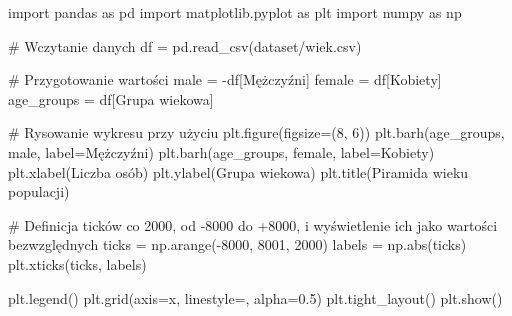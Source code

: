 \documentclass[
  polish,
  letterpaper,
  DIV=11,
  numbers=noendperiod]{scrreprt}
\newenvironment{Shaded}{\begin{snugshade}}{\end{snugshade}}
\newcommand{\BuiltInTok}[1]{\textcolor[rgb]{0.00,0.23,0.31}{#1}}
\newcommand{\CommentTok}[1]{\textcolor[rgb]{0.37,0.37,0.37}{#1}}
\newcommand{\DecValTok}[1]{\textcolor[rgb]{0.68,0.00,0.00}{#1}}
\newcommand{\FloatTok}[1]{\textcolor[rgb]{0.68,0.00,0.00}{#1}}
\newcommand{\ImportTok}[1]{\textcolor[rgb]{0.00,0.46,0.62}{#1}}
\newcommand{\NormalTok}[1]{\textcolor[rgb]{0.00,0.23,0.31}{#1}}
\newcommand{\OperatorTok}[1]{\textcolor[rgb]{0.37,0.37,0.37}{#1}}
\newcommand{\StringTok}[1]{\textcolor[rgb]{0.13,0.47,0.30}{#1}}
\begin{document}
\begin{Shaded}
\begin{Highlighting}[]
\ImportTok{import}\NormalTok{ pandas }\ImportTok{as}\NormalTok{ pd}
\ImportTok{import}\NormalTok{ matplotlib.pyplot }\ImportTok{as}\NormalTok{ plt}
\ImportTok{import}\NormalTok{ numpy }\ImportTok{as}\NormalTok{ np}

\CommentTok{\# Wczytanie danych}
\NormalTok{df }\OperatorTok{=}\NormalTok{ pd.read\_csv(}\StringTok{\textquotesingle{}dataset/wiek.csv\textquotesingle{}}\NormalTok{)}

\CommentTok{\# Przygotowanie wartości}
\NormalTok{male }\OperatorTok{=} \OperatorTok{{-}}\NormalTok{df[}\StringTok{\textquotesingle{}Mężczyźni\textquotesingle{}}\NormalTok{]}
\NormalTok{female }\OperatorTok{=}\NormalTok{ df[}\StringTok{\textquotesingle{}Kobiety\textquotesingle{}}\NormalTok{]}
\NormalTok{age\_groups }\OperatorTok{=}\NormalTok{ df[}\StringTok{\textquotesingle{}Grupa wiekowa\textquotesingle{}}\NormalTok{]}

\CommentTok{\# Rysowanie wykresu przy użyciu}
\NormalTok{plt.figure(figsize}\OperatorTok{=}\NormalTok{(}\DecValTok{8}\NormalTok{, }\DecValTok{6}\NormalTok{))}
\NormalTok{plt.barh(age\_groups, male, label}\OperatorTok{=}\StringTok{\textquotesingle{}Mężczyźni\textquotesingle{}}\NormalTok{)}
\NormalTok{plt.barh(age\_groups, female, label}\OperatorTok{=}\StringTok{\textquotesingle{}Kobiety\textquotesingle{}}\NormalTok{)}
\NormalTok{plt.xlabel(}\StringTok{\textquotesingle{}Liczba osób\textquotesingle{}}\NormalTok{)}
\NormalTok{plt.ylabel(}\StringTok{\textquotesingle{}Grupa wiekowa\textquotesingle{}}\NormalTok{)}
\NormalTok{plt.title(}\StringTok{\textquotesingle{}Piramida wieku populacji\textquotesingle{}}\NormalTok{)}

\CommentTok{\# Definicja ticków co 2000, od {-}8000 do +8000, i wyświetlenie ich jako wartości bezwzględnych}
\NormalTok{ticks }\OperatorTok{=}\NormalTok{ np.arange(}\OperatorTok{{-}}\DecValTok{8000}\NormalTok{, }\DecValTok{8001}\NormalTok{, }\DecValTok{2000}\NormalTok{)}
\NormalTok{labels }\OperatorTok{=}\NormalTok{ np.}\BuiltInTok{abs}\NormalTok{(ticks)}
\NormalTok{plt.xticks(ticks, labels)}

\NormalTok{plt.legend()}
\NormalTok{plt.grid(axis}\OperatorTok{=}\StringTok{\textquotesingle{}x\textquotesingle{}}\NormalTok{, linestyle}\OperatorTok{=}\StringTok{\textquotesingle{}{-}{-}\textquotesingle{}}\NormalTok{, alpha}\OperatorTok{=}\FloatTok{0.5}\NormalTok{)}
\NormalTok{plt.tight\_layout()}
\NormalTok{plt.show()}
\end{Highlighting}
\end{Shaded}
\end{document}
